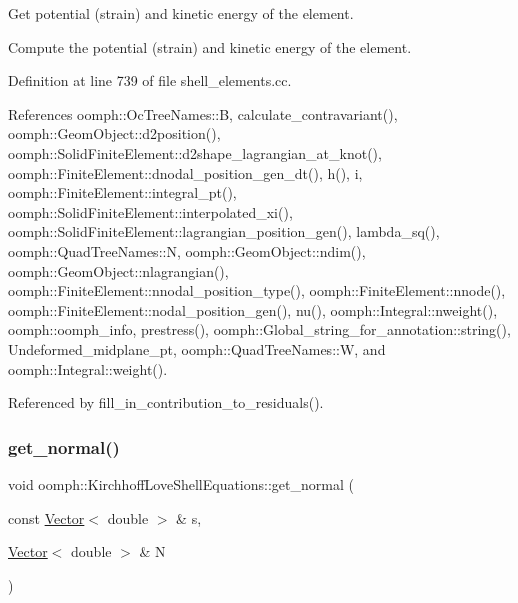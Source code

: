 Get potential (strain) and kinetic energy of the element. 

Compute the potential (strain) and kinetic energy of the element. 

Definition at line 739 of file shell\+\_\+elements.\+cc.



References oomph\+::\+Oc\+Tree\+Names\+::B, calculate\+\_\+contravariant(), oomph\+::\+Geom\+Object\+::d2position(), oomph\+::\+Solid\+Finite\+Element\+::d2shape\+\_\+lagrangian\+\_\+at\+\_\+knot(), oomph\+::\+Finite\+Element\+::dnodal\+\_\+position\+\_\+gen\+\_\+dt(), h(), i, oomph\+::\+Finite\+Element\+::integral\+\_\+pt(), oomph\+::\+Solid\+Finite\+Element\+::interpolated\+\_\+xi(), oomph\+::\+Solid\+Finite\+Element\+::lagrangian\+\_\+position\+\_\+gen(), lambda\+\_\+sq(), oomph\+::\+Quad\+Tree\+Names\+::N, oomph\+::\+Geom\+Object\+::ndim(), oomph\+::\+Geom\+Object\+::nlagrangian(), oomph\+::\+Finite\+Element\+::nnodal\+\_\+position\+\_\+type(), oomph\+::\+Finite\+Element\+::nnode(), oomph\+::\+Finite\+Element\+::nodal\+\_\+position\+\_\+gen(), nu(), oomph\+::\+Integral\+::nweight(), oomph\+::oomph\+\_\+info, prestress(), oomph\+::\+Global\+\_\+string\+\_\+for\+\_\+annotation\+::string(), Undeformed\+\_\+midplane\+\_\+pt, oomph\+::\+Quad\+Tree\+Names\+::W, and oomph\+::\+Integral\+::weight().



Referenced by fill\+\_\+in\+\_\+contribution\+\_\+to\+\_\+residuals().

\mbox{\label{classoomph_1_1KirchhoffLoveShellEquations_a797e455634ac8b8e8669c4adff84e644}} 
\subsubsection{\texorpdfstring{get\+\_\+normal()}{get\_normal()}}
{\footnotesize\ttfamily void oomph\+::\+Kirchhoff\+Love\+Shell\+Equations\+::get\+\_\+normal (\begin{DoxyParamCaption}\item[{const \hyperlink{classoomph_1_1Vector}{Vector}$<$ double $>$ \&}]{s,  }\item[{\hyperlink{classoomph_1_1Vector}{Vector}$<$ double $>$ \&}]{N }\end{DoxyParamCaption})}



